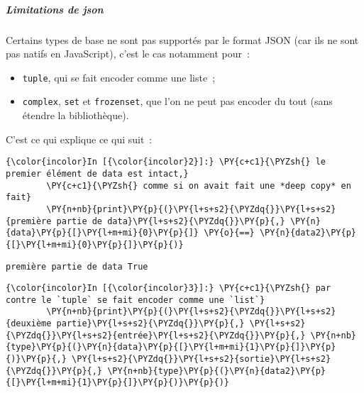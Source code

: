     \hypertarget{limitations-de-json}{%
\subparagraph{Limitations de json}\label{limitations-de-json}}

    Certains types de base ne sont pas supportés par le format JSON (car ils
ne sont pas natifs en JavaScript), c'est le cas notamment pour~:

\begin{itemize}
\tightlist
\item
  \texttt{tuple}, qui se fait encoder comme une liste~;
\item
  \texttt{complex}, \texttt{set} et \texttt{frozenset}, que l'on ne peut
  pas encoder du tout (sans étendre la bibliothèque).
\end{itemize}

    C'est ce qui explique ce qui suit~:

    \begin{Verbatim}[commandchars=\\\{\},frame=single,framerule=0.3mm,rulecolor=\color{cellframecolor}]
{\color{incolor}In [{\color{incolor}2}]:} \PY{c+c1}{\PYZsh{} le premier élément de data est intact,}
        \PY{c+c1}{\PYZsh{} comme si on avait fait une *deep copy* en fait}
        \PY{n+nb}{print}\PY{p}{(}\PY{l+s+s2}{\PYZdq{}}\PY{l+s+s2}{première partie de data}\PY{l+s+s2}{\PYZdq{}}\PY{p}{,} \PY{n}{data}\PY{p}{[}\PY{l+m+mi}{0}\PY{p}{]} \PY{o}{==} \PY{n}{data2}\PY{p}{[}\PY{l+m+mi}{0}\PY{p}{]}\PY{p}{)}
\end{Verbatim}


    \begin{Verbatim}[commandchars=\\\{\},frame=single,framerule=0.3mm,rulecolor=\color{cellframecolor}]
première partie de data True
\end{Verbatim}

    \begin{Verbatim}[commandchars=\\\{\},frame=single,framerule=0.3mm,rulecolor=\color{cellframecolor}]
{\color{incolor}In [{\color{incolor}3}]:} \PY{c+c1}{\PYZsh{} par contre le `tuple` se fait encoder comme une `list`}
        \PY{n+nb}{print}\PY{p}{(}\PY{l+s+s2}{\PYZdq{}}\PY{l+s+s2}{deuxième partie}\PY{l+s+s2}{\PYZdq{}}\PY{p}{,} \PY{l+s+s2}{\PYZdq{}}\PY{l+s+s2}{entrée}\PY{l+s+s2}{\PYZdq{}}\PY{p}{,} \PY{n+nb}{type}\PY{p}{(}\PY{n}{data}\PY{p}{[}\PY{l+m+mi}{1}\PY{p}{]}\PY{p}{)}\PY{p}{,} \PY{l+s+s2}{\PYZdq{}}\PY{l+s+s2}{sortie}\PY{l+s+s2}{\PYZdq{}}\PY{p}{,} \PY{n+nb}{type}\PY{p}{(}\PY{n}{data2}\PY{p}{[}\PY{l+m+mi}{1}\PY{p}{]}\PY{p}{)}\PY{p}{)}
\end{Verbatim}


